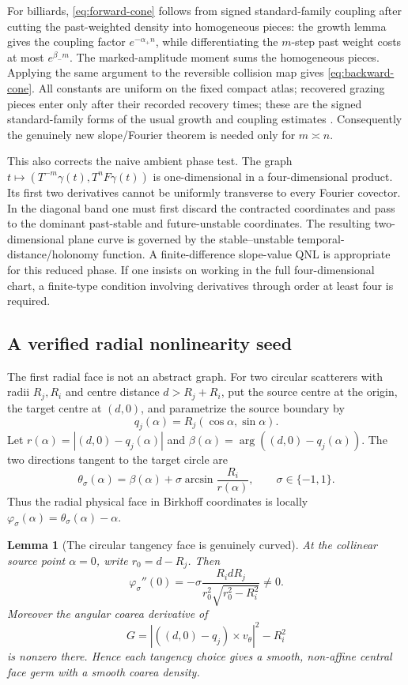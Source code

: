 \documentclass[11pt]{article}
\newtheorem{lemma}[theorem]{Lemma}
\begin{document}
For billiards, \eqref{eq:forward-cone} follows from signed
standard-family coupling after cutting the past-weighted density into
homogeneous pieces: the growth lemma gives the coupling factor
$e^{-\alpha_+n}$, while differentiating the $m$-step past weight costs at
most $e^{\beta_-m}$.  The marked-amplitude moment sums the homogeneous
pieces.  Applying the same argument to the reversible collision map gives
\eqref{eq:backward-cone}.  All constants are uniform on the fixed compact
atlas; recovered grazing pieces enter only after their recorded recovery
times; these are the signed standard-family forms of the usual growth and
coupling estimates \cite{Chernov1999,DLreview}.
Consequently the genuinely new slope/Fourier theorem is needed only for
$m\asymp n$.

This also corrects the naive ambient phase test.  The graph
$t\mapsto(T^{-m}\gamma(t),T^nF\gamma(t))$ is one-dimensional in a
four-dimensional product.  Its first two derivatives cannot be uniformly
transverse to every Fourier covector.  In the diagonal band one must first
discard the contracted coordinates and pass to the dominant past-stable and
future-unstable coordinates.  The resulting two-dimensional plane curve is
governed by the stable--unstable temporal-distance/holonomy function.  A
finite-difference slope-value QNL is appropriate for this reduced phase.  If
one insists on working in the full four-dimensional chart, a finite-type
condition involving derivatives through order at least four is required.

\subsection{A verified radial nonlinearity seed}

The first radial face is not an abstract graph.  For two circular scatterers
with radii $R_j,R_i$ and centre distance $d>R_j+R_i$, put the source centre at
the origin, the target centre at $(d,0)$, and parametrize the source boundary
by
\[
 q_j(\alpha)=R_j(\cos\alpha,\sin\alpha).
\]
Let $r(\alpha)=|(d,0)-q_j(\alpha)|$ and
$\beta(\alpha)=\arg((d,0)-q_j(\alpha))$.  The two directions tangent to the
target circle are
\[
 \theta_\sigma(\alpha)
 =\beta(\alpha)+\sigma\arcsin\frac{R_i}{r(\alpha)},
 \qquad \sigma\in\{-1,1\}.
\]
Thus the radial physical face in Birkhoff coordinates is locally
$\varphi_\sigma(\alpha)=\theta_\sigma(\alpha)-\alpha$.

\begin{lemma}[The circular tangency face is genuinely curved]
\label{lem:circular-face-curvature}
At the collinear source point $\alpha=0$, write $r_0=d-R_j$.  Then
\begin{equation}
\label{eq:circular-face-curvature}
 \varphi_\sigma''(0)
 =-\sigma\frac{R_i dR_j}
 {r_0^2\sqrt{r_0^2-R_i^2}}\ne0.
\end{equation}
Moreover the angular coarea derivative of
\[
 G=|((d,0)-q_j)\times v_\theta|^2-R_i^2
\]
is nonzero there.  Hence each tangency choice gives a smooth, non-affine
central face germ with a smooth coarea density.
\end{lemma}
\end{document}
